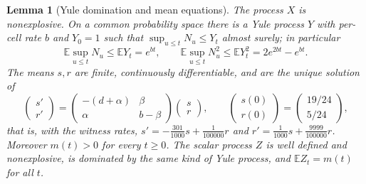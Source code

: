 \documentclass[11pt,a4paper]{article}
\theoremstyle{plain}
\newtheorem{lemma}[theorem]{Lemma}
\theoremstyle{definition}
\theoremstyle{remark}
\newcommand{\EE}{\mathbb E}
\begin{document}
\begin{lemma}[Yule domination and mean equations]\label{lem:moments}
The process $X$ is nonexplosive. On a common probability space there is a Yule process $Y$ with per-cell rate $b$ and $Y_0=1$ such that $\sup_{u\le t}N_u\le Y_t$ almost surely; in particular
\begin{equation}\label{eq:yule}
\EE\sup_{u\le t}N_u\le\EE Y_t=e^{bt},\qquad \EE\sup_{u\le t}N_u^2\le\EE Y_t^2=2e^{2bt}-e^{bt}.
\end{equation}
The means $s,r$ are finite, continuously differentiable, and are the unique solution of
\begin{equation}\label{eq:means}
\begin{pmatrix}s'\\ r'\end{pmatrix}
=\begin{pmatrix}-(d+\alpha)&\beta\\ \alpha&b-\beta\end{pmatrix}\begin{pmatrix}s\\ r\end{pmatrix},
\qquad \begin{pmatrix}s(0)\\ r(0)\end{pmatrix}=\begin{pmatrix}19/24\\ 5/24\end{pmatrix},
\end{equation}
that is, with the witness rates, $s'=-\frac{301}{1000}s+\frac1{100000}r$ and $r'=\frac1{1000}s+\frac{9999}{100000}r$.
Moreover $m(t)>0$ for every $t\ge0$. The scalar process $Z$ is well defined and nonexplosive, is dominated by the same kind of Yule process, and $\EE Z_t=m(t)$ for all $t$.
\end{lemma}
\end{document}
